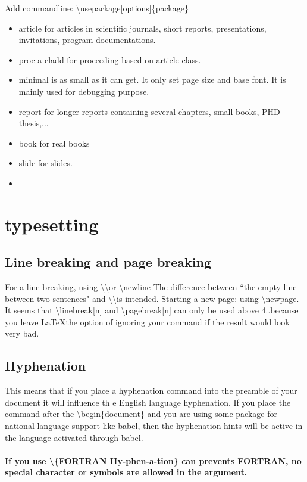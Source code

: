 \documentclass[11pt]{article}
\begin{document}
Add commandline: \textbackslash usepackage[options]\{package\}
\begin{itemize}
	\item
		article for articles in scientific journals, short reports, presentations, invitations, program documentations.
	\item
		proc a cladd for proceeding based on article class.
	\item
		minimal is as small as it can get. It only set page size and base font. It is mainly used for debugging purpose.
	\item
		report for longer reports containing several chapters, small books, PHD thesis,...
	\item
		book for real books
	\item
		slide for slides. 
	\item
\end{itemize}


\section{typesetting}
\subsection{Line breaking and page breaking}
For a line breaking, using \textbackslash\textbackslash or \textbackslash newline
The difference between ``the empty line between two sentences" and \textbackslash\textbackslash is intended.
Starting a new page: using \textbackslash newpage.
It seems that \textbackslash linebreak[n] and \textbackslash pagebreak[n] can only be used above 4..because you leave \LaTeX the option of ignoring your command if the result would look very bad.
\subsection{Hyphenation}
This means that if you place a hyphenation command into the preamble of your document it will influence th e English language hyphenation. If you place the command after the \textbackslash begin\{document\} and you are using some package for national language support like babel, then the hyphenation hints will be active in the language activated through babel.

\paragraph{If you use \textbackslash\{FORTRAN Hy-phen-a-tion\} can prevents FORTRAN, no special character or symbols are allowed in the argument.}
\end{document}
